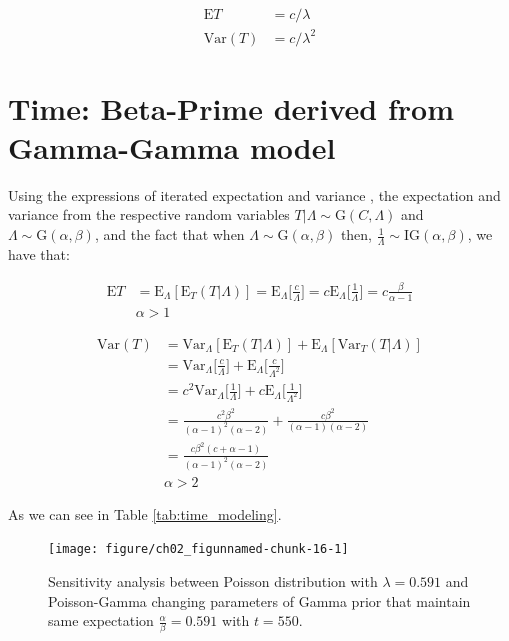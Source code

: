 \begin{align*}
\textrm{E}T & = c/\lambda\\
\textrm{Var}(T) & = c/\lambda^2
\end{align*}


\section{Time: Beta-Prime derived from Gamma-Gamma model}

Using the expressions of iterated expectation and variance \citep{held2014applied}, the expectation and variance from the respective random variables $T|\Lambda \sim \textrm{G}(C, \Lambda)$ and $\Lambda \sim \textrm{G}(\alpha,\beta)$, and the fact that when $\Lambda \sim \textrm{G}(\alpha, \beta)$ then, $\frac{1}{\Lambda} \sim \textrm{IG}(\alpha, \beta)$, we have that:


\begin{align*}
\textrm{E}T &= \textrm{E}_{\Lambda}[\textrm{E}_{T} (T|\Lambda)] = \textrm{E}_{\Lambda}\Bigg [\frac{c}{\Lambda}\Bigg ] = c \textrm{E}_{\Lambda}\Bigg [\frac{1}{\Lambda}\Bigg ] = c\frac{\beta}{\alpha-1}\\
&\alpha>1
\end{align*}


\begin{align*}
\textrm{Var}(T) &= \textrm{Var}_{\Lambda}[\textrm{E}_{T} (T|\Lambda)] + \textrm{E}_{\Lambda}[\textrm{Var}_T(T|\Lambda)]\\
&=\textrm{Var}_{\Lambda}\Bigg [\frac{c}{\Lambda}\Bigg ] + \textrm{E}_{\Lambda}\Bigg [\frac{c}{\Lambda^2}\Bigg ] \\
&=c^2\textrm{Var}_{\Lambda}\Bigg [\frac{1}{\Lambda}\Bigg ] + c\textrm{E}_{\Lambda}\Bigg [\frac{1}{\Lambda^2}\Bigg ] \\
&=\frac{c^2\beta^2}{(\alpha-1)^2(\alpha-2)} + \frac{c\beta^2}{(\alpha-1)(\alpha-2)}\\
&=\frac{c\beta^2(c+\alpha-1)}{(\alpha-1)^2(\alpha-2)}\\
&\alpha>2
\end{align*}

As we can see in Table \ref{tab:time_modeling}.


\begin{figure}
\begin{knitrout}
\color{fgcolor}

{\centering \texttt{[image: figure/ch02\_figunnamed-chunk-16-1]} 

}


\end{knitrout}
	\caption{Sensitivity analysis between Poisson distribution with $\lambda = 0.591$ and Poisson-Gamma changing parameters of Gamma prior that maintain same expectation $\frac{\alpha}{\beta} = 0.591$ with $t=550$.}
  \label{fig:2_6a}
\end{figure}



